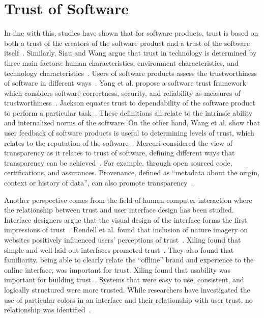 \documentclass{article}
\begin{document}
\section{Trust of Software} 
In line with this, studies have shown that for software products, trust is based on both a trust of the creators of the software product and a trust of the software itself~\cite{sollner2016different,jackson2009direct}. Similarly, Siau and Wang argue that trust in technology is determined by three main factors: human characteristics, environment characteristics, and technology characteristics~\cite{siau2018building}. Users of software products assess the trustworthiness of software in different ways~\cite{jackson2009direct, yang2018unified, grodzinsky2011developing}. Yang et al. propose a software trust framework which considers software correctness, security, and reliability as measures of trustworthiness~\cite{yang2018unified}. Jackson equates trust to dependability of the software product to perform a particular task~\cite{jackson2009direct}. These definitions all relate to the intrinsic ability and internalized norms of the software. On the other hand, Wang et al. show that user feedback of software products is useful to determining levels of trust, which relates to the reputation of the software~\cite{wang2019updating}. Mercuri considered the view of transparency as it relates to trust of software, defining different ways that transparency can be achieved~\cite{mercuri2005trusting}. For example, through open sourced code, certifications, and assurances. Provenance, defined as ``metadata about the origin, context or history of data'', can also promote transparency~\cite{cheney2009provenance}. 

Another perspective comes from the field of human computer interaction where the relationship between trust and user interface design has been studied. Interface designers argue that the visual design of the interface forms the first impressions of trust~\cite{weinschenk2011100}. Rendell et al. found that inclusion of nature imagery on websites positively influenced users' perceptions of trust~\cite{rendell2021nature}. Xiling found that simple and well laid out interfaces promoted trust~\cite{xiling2005effective}. They also found that familiarity, being able to clearly relate the ``offline'' brand and experience to the online interface, was important for trust. Xiling found that usability was important for building trust~\cite{xiling2005effective}. Systems that were easy to use, consistent, and logically structured were more trusted. While researchers have investigated the use of particular colors in an interface and their relationship with user trust, no relationship was identified~\cite{hawlitschek2016colors}. 
\end{document}
